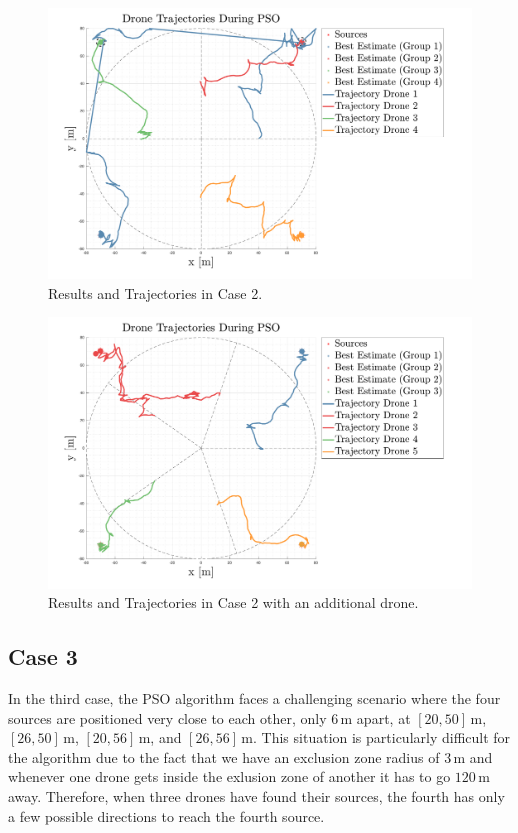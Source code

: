 \begin{figure}
    \centering
    \includegraphics[width=1.06\textwidth]{images/case_2.pdf}
    \caption[PSO Case 2]{Results and Trajectories in Case 2.}
    \label{fig:case2}
\end{figure}
\begin{figure}[H]
    \centering
    \includegraphics[width=1.06\textwidth]{images/case_2_more.pdf}
    \caption[PSO Case 2]{Results and Trajectories in Case 2 with an additional drone.}
    \label{fig:case2more}
\end{figure}

\subsection{Case 3}
In the third case, the PSO algorithm faces a challenging scenario where 
the four sources are positioned very close to each other, only \(6 \, \text{m}\) apart, 
at \([20, 50] \, \text{m}\), \([26, 50] \, \text{m}\), \([20, 56] \, \text{m}\), and \([26, 56] \, \text{m}\). 
This situation is particularly difficult for the algorithm due to 
the fact that we have an exclusion zone radius of \(3 \, \text{m}\) and 
whenever one drone gets inside the exlusion zone of another
it has to go \(120 \, \text{m}\) away.
Therefore, when three drones have found their sources, the fourth has only a few
possible directions to reach the fourth source.

